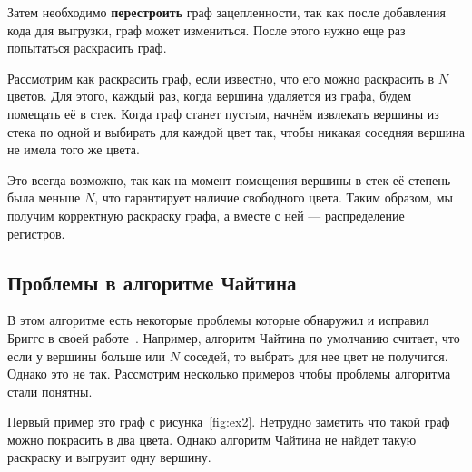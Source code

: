 Затем необходимо \textbf{перестроить} граф зацепленности, так как после добавления кода для выгрузки, граф может измениться. После этого нужно
еще раз попытаться раскрасить граф.

Рассмотрим как раскрасить граф, если известно, что его можно раскрасить в $N$ цветов. Для этого, каждый раз, когда вершина
удаляется из графа, будем помещать её в стек. Когда граф станет пустым, начнём извлекать вершины из стека по одной и выбирать
для каждой цвет так, чтобы никакая соседняя вершина не имела того же цвета. 

Это всегда возможно, так как на момент помещения вершины в стек её степень была меньше $N$, что гарантирует наличие свободного
цвета. Таким образом, мы получим корректную раскраску графа, а вместе с ней — распределение регистров.

\subsection{Проблемы в алгоритме Чайтина}

В этом алгоритме есть некоторые проблемы которые обнаружил и исправил Бриггс в своей работе~\cite{briggs1994}.
Например, алгоритм Чайтина по умолчанию считает, что если у вершины больше или $N$ соседей,
то выбрать для нее цвет не получится.
Однако это не так. 
Рассмотрим несколько примеров чтобы проблемы алгоритма стали понятны.

Первый пример это граф с рисунка~\ref{fig:ex2}. Нетрудно заметить что такой граф можно покрасить в два цвета.
Однако алгоритм Чайтина не найдет такую раскраску и выгрузит одну вершину.

\begin{figure}[H]
    \centering
\end{figure} %

